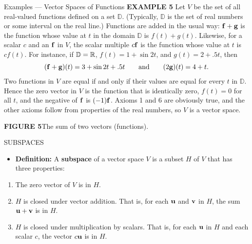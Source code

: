 \begin{frame}[shrink=24]{Examples --- Vector Spaces of Functions}
\textcolor{red!70!black}{\textbf{EXAMPLE 5}}\quad
Let $V$ be the set of all real-valued functions defined on a set $\mathbb D$. (Typically, $\mathbb D$ is the set of real numbers or some interval on the real line.) Functions are added in the usual way: $\mathbf{f}+\mathbf{g}$ is the function whose value at $t$ in the domain $\mathbb D$ is $f(t)+g(t)$. Likewise, for a scalar $c$ and an $\mathbf{f}$ in $V$, the scalar multiple $c\mathbf{f}$ is the function whose value at $t$ is $cf(t)$. For instance, if $\mathbb D=\mathbb{R}$, $f(t)=1+\sin 2t$, and $g(t)=2+.5t$, then
\[
(\mathbf{f}+\mathbf{g})(t)=3+\sin 2t+.5t
\qquad\text{and}\qquad
(2\mathbf{g})(t)=4+t.
\]
Two functions in $V$ are equal if and only if their values are equal for every $t$ in $\mathbb D$. Hence the zero vector in $V$ is the function that is identically zero, $f(t)=0$ for all $t$, and the negative of $\mathbf{f}$ is $(-1)\mathbf{f}$. Axioms 1 and 6 are obviously true, and the other axioms follow from properties of the real numbers, so $V$ is a vector space.

\begin{center}

\textbf{FIGURE 5}\quad The sum of two vectors (functions).
\end{center}
\end{frame}

\begin{frame}[shrink=9]{SUBSPACES}
\begin{itemize}
\item \textbf{Definition:} A \textbf{subspace} of a vector space $V$ is a subset $H$ of $V$ that has three properties:
\end{itemize}
\begin{enumerate}
\item[(a.)] The zero vector of $V$ is in $H$.
\item[(b.)] $H$ is closed under vector addition. That is, for each $\mathbf{u}$ and $\mathbf{v}$ in $H$, the sum $\mathbf{u}+\mathbf{v}$ is in $H$.
\item[(c.)] $H$ is closed under multiplication by scalars. That is, for each $\mathbf{u}$ in $H$ and each scalar $c$, the vector $c\mathbf{u}$ is in $H$.
\end{enumerate}
\end{frame}

